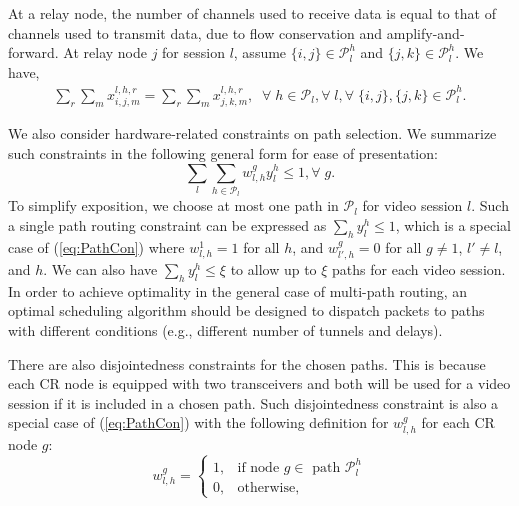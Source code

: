 \documentclass[12pt,onecolumn,draftclsnofoot]{IEEEtran} %
\begin{document}
At a relay node, the number of channels used to receive data is equal to that of channels used to transmit data, due to flow conservation and amplify-and-forward.  At relay node $j$ for session $l$, assume $\{i,j\}\in \mathcal{P}_l^h$ and $\{j,k\}\in \mathcal{P}_l^h$.  We have,
\begin{eqnarray}\label{eq:IntmFlow}
  \sum_r\sum_m x_{i,j,m}^{l,h,r} = \sum_r\sum_m x_{j,k,m}^{l,h,r}, \;\; 
  \forall \; h \in \mathcal{P}_l, \forall \; l, \forall \; \{i,j\} ,\{j,k\} \in \mathcal{P}_l^h.
\end{eqnarray}

We also consider hardware-related constraints on path selection. We summarize such constraints in the following general form for ease of presentation:
\begin{equation} \label{eq:PathCon}
  \sum_l\sum_{h\in \mathcal{P}_l} w_{l,h}^g y_l^h \le 1, \forall \; g.
\end{equation} 
To simplify exposition, we choose at most one path in $\mathcal{P}_l$ for video session $l$.  Such a single path routing constraint can be expressed as $\sum_h y_l^h \leq 1$, which is a special case of (\ref{eq:PathCon}) where $w_{l,h}^1=1$ for all $h$, and $w_{l',h}^g=0$ for all $g \neq 1$, $l' \neq l$, and $h$.  We can also have $\sum_h y_l^h \leq \xi$ to allow up to $\xi$ paths for each video session.  In order to achieve optimality in the general case of multi-path routing, an optimal scheduling algorithm should be designed to dispatch packets to paths with different conditions (e.g., different number of tunnels and delays). 

There are also disjointedness constraints for the chosen paths.  This is because each CR node is equipped with two transceivers and both will be used for a video session if it is included in a chosen path.  Such disjointedness constraint is also a special case of (\ref{eq:PathCon}) with the following definition for $w_{l,h}^g$ for each CR node $g$: 
\begin{equation} \label{eq:d}
  w_{l,h}^g = \left\{ \begin{array}{ll}
          1, & \mbox{if node $g \in $ path $\mathcal{P}_l^h$} \\
          0, & \mbox{otherwise},
                      \end{array} \right. 
\end{equation}
\end{document}
